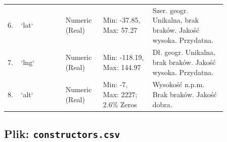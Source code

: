 \documentclass[a4paper,12pt]{article}
\begin{document}
\begin{longtable}{|p{0.03\linewidth}|p{0.18\linewidth}|p{0.15\linewidth}|p{0.2\linewidth}|p{0.3\linewidth}|}
  \tiny 6.          & \tiny `lat`           & \tiny Numeric (Real)     & \tiny Min: -37.85, Max: 57.27         & \tiny Szer. geogr. Unikalna, brak braków. Jakość wysoka. Przydatna. \\
  \tiny 7.          & \tiny `lng`           & \tiny Numeric (Real)     & \tiny Min: -118.19, Max: 144.97       & \tiny Dł. geogr. Unikalna, brak braków. Jakość wysoka. Przydatna.   \\
  \tiny 8.          & \tiny `alt`           & \tiny Numeric (Real)     & \tiny Min: -7, Max: 2227; 2.6\% Zeros & \tiny Wysokość n.p.m. Brak braków. Jakość dobra.                    \\
\end{longtable}

\subsection{Plik: \texttt{constructors.csv}}
\end{document}
